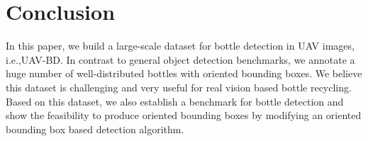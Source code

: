 \section{Conclusion}
\label{sec:conclusion}


In this paper, we build a large-scale dataset for bottle detection in UAV images, i.e.,UAV-BD. In contrast to general object detection benchmarks, we annotate a huge number of well-distributed bottles with oriented bounding boxes. We believe this dataset is challenging and very useful for real vision based bottle recycling. Based on this dataset, we also establish a benchmark for bottle detection and show the feasibility to produce oriented bounding boxes by modifying an oriented bounding box based detection algorithm.